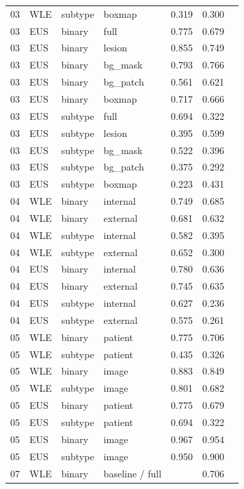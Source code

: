 \begin{longtable}{cL{1.1cm}L{1.5cm}L{5.6cm}ccc}
03 & WLE & subtype & boxmap & 0.319 & 0.300 & \nl{} \\
03 & EUS & binary & full & 0.775 & 0.679 & \nl{} \\
03 & EUS & binary & lesion & 0.855 & 0.749 & \nl{} \\
03 & EUS & binary & bg\_mask & 0.793 & 0.766 & \nl{} \\
03 & EUS & binary & bg\_patch & 0.561 & 0.621 & \nl{} \\
03 & EUS & binary & boxmap & 0.717 & 0.666 & \nl{} \\
03 & EUS & subtype & full & 0.694 & 0.322 & \nl{} \\
03 & EUS & subtype & lesion & 0.395 & 0.599 & \nl{} \\
03 & EUS & subtype & bg\_mask & 0.522 & 0.396 & \nl{} \\
03 & EUS & subtype & bg\_patch & 0.375 & 0.292 & \nl{} \\
03 & EUS & subtype & boxmap & 0.223 & 0.431 & \nl{} \\
04 & WLE & binary & internal & 0.749 & 0.685 & \nl{} \\
04 & WLE & binary & external & 0.681 & 0.632 & \nl{} \\
04 & WLE & subtype & internal & 0.582 & 0.395 & \nl{} \\
04 & WLE & subtype & external & 0.652 & 0.300 & \nl{} \\
04 & EUS & binary & internal & 0.780 & 0.636 & \nl{} \\
04 & EUS & binary & external & 0.745 & 0.635 & \nl{} \\
04 & EUS & subtype & internal & 0.627 & 0.236 & \nl{} \\
04 & EUS & subtype & external & 0.575 & 0.261 & \nl{} \\
05 & WLE & binary & patient & 0.775 & 0.706 & \nl{} \\
05 & WLE & subtype & patient & 0.435 & 0.326 & \nl{} \\
05 & WLE & binary & image & 0.883 & 0.849 & \nl{} \\
05 & WLE & subtype & image & 0.801 & 0.682 & \nl{} \\
05 & EUS & binary & patient & 0.775 & 0.679 & \nl{} \\
05 & EUS & subtype & patient & 0.694 & 0.322 & \nl{} \\
05 & EUS & binary & image & 0.967 & 0.954 & \nl{} \\
05 & EUS & subtype & image & 0.950 & 0.900 & \nl{} \\
07 & WLE & binary & baseline / full & \nl{} & 0.706 & \nl{} \\

\end{longtable}

